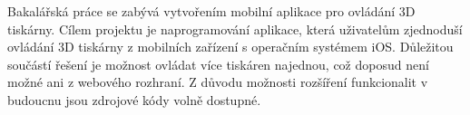 Bakalářská práce se zabývá vytvořením mobilní aplikace pro ovládání 3D tiskárny.
Cílem projektu je naprogramování aplikace, která uživatelům zjednoduší ovládání 3D tiskárny z mobilních zařízení s operačním systémem iOS.
Důležitou součástí řešení je možnost ovládat více tiskáren najednou, což doposud není možné ani z webového rozhraní.
Z důvodu možnosti rozšíření funkcionalit v budoucnu jsou zdrojové kódy volně dostupné.
